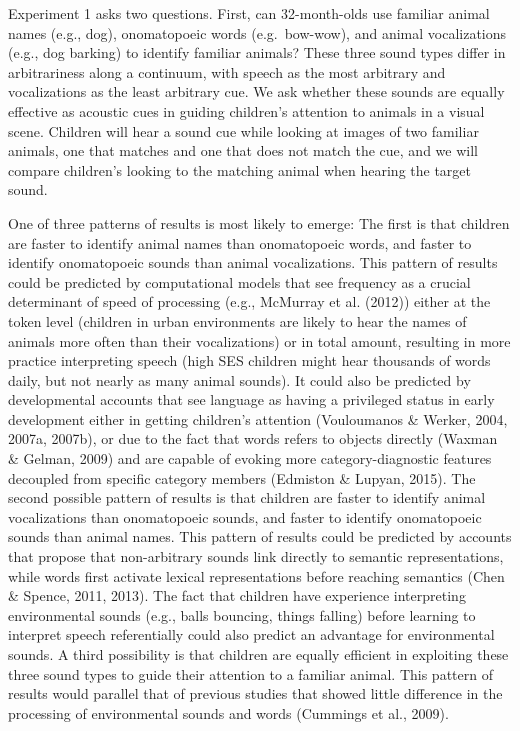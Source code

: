 \documentclass[english,floatsintext,man]{apa6}
\theoremstyle{definition}
\theoremstyle{definition}
\theoremstyle{definition}
\theoremstyle{remark}
\begin{document}
Experiment 1 asks two questions. First, can 32-month-olds use familiar
animal names (e.g., dog), onomatopoeic words (e.g.~bow-wow), and animal
vocalizations (e.g., dog barking) to identify familiar animals? These
three sound types differ in arbitrariness along a continuum, with speech
as the most arbitrary and vocalizations as the least arbitrary cue. We
ask whether these sounds are equally effective as acoustic cues in
guiding children's attention to animals in a visual scene. Children will
hear a sound cue while looking at images of two familiar animals, one
that matches and one that does not match the cue, and we will compare
children's looking to the matching animal when hearing the target sound.

One of three patterns of results is most likely to emerge: The first is
that children are faster to identify animal names than onomatopoeic
words, and faster to identify onomatopoeic sounds than animal
vocalizations. This pattern of results could be predicted by
computational models that see frequency as a crucial determinant of
speed of processing (e.g., McMurray et al. (2012)) either at the token
level (children in urban environments are likely to hear the names of
animals more often than their vocalizations) or in total amount,
resulting in more practice interpreting speech (high SES children might
hear thousands of words daily, but not nearly as many animal sounds). It
could also be predicted by developmental accounts that see language as
having a privileged status in early development either in getting
children's attention (Vouloumanos \& Werker, 2004, 2007a, 2007b), or due
to the fact that words refers to objects directly (Waxman \& Gelman,
2009) and are capable of evoking more category-diagnostic features
decoupled from specific category members (Edmiston \& Lupyan, 2015). The
second possible pattern of results is that children are faster to
identify animal vocalizations than onomatopoeic sounds, and faster to
identify onomatopoeic sounds than animal names. This pattern of results
could be predicted by accounts that propose that non-arbitrary sounds
link directly to semantic representations, while words first activate
lexical representations before reaching semantics (Chen \& Spence, 2011,
2013). The fact that children have experience interpreting environmental
sounds (e.g., balls bouncing, things falling) before learning to
interpret speech referentially could also predict an advantage for
environmental sounds. A third possibility is that children are equally
efficient in exploiting these three sound types to guide their attention
to a familiar animal. This pattern of results would parallel that of
previous studies that showed little difference in the processing of
environmental sounds and words (Cummings et al., 2009).
\end{document}
